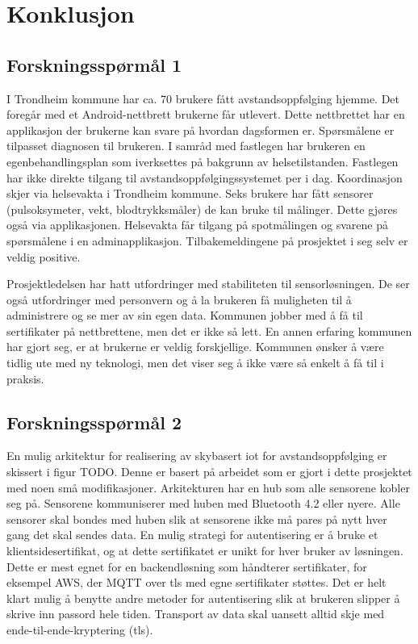 \chapter{Konklusjon}
\label{ch:conclusion}

\section{Forskningsspørmål 1}
\textbf{}

I Trondheim kommune har ca. 70 brukere fått avstandsoppfølging hjemme. Det
foregår med et Android-nettbrett brukerne får utlevert. Dette nettbrettet har en
applikasjon der brukerne kan svare på hvordan dagsformen er. Spørsmålene er
tilpasset diagnosen til brukeren. I samråd med fastlegen har brukeren en
egenbehandlingsplan som iverksettes på bakgrunn av helsetilstanden. Fastlegen
har ikke direkte tilgang til avstandsoppfølgingssystemet per i dag. Koordinasjon skjer via
helsevakta i Trondheim kommune. Seks brukere har fått sensorer (pulsoksymeter, vekt, blodtrykksmåler) de kan bruke
til målinger. Dette gjøres også via applikasjonen. Helsevakta får tilgang på
spotmålingen og svarene på spørsmålene i en adminapplikasjon.
Tilbakemeldingene på prosjektet i seg selv er veldig positive.

Prosjektledelsen har hatt utfordringer med stabiliteten til sensorløsningen.
De ser også utfordringer med personvern og å la brukeren få muligheten til å administrere og se mer av sin egen data.
Kommunen jobber med å få til sertifikater på nettbrettene, men det er ikke så lett. En annen erfaring
kommunen har gjort seg, er at brukerne er veldig forskjellige. Kommunen ønsker å være tidlig ute med
ny teknologi, men det viser seg å ikke være så enkelt å få til i praksis.

\section{Forskningsspørmål 2}
\textbf{}

En mulig arkitektur for realisering av skybasert \gls{iot} for
avstandsoppfølging er skissert i figur TODO. Denne er basert på arbeidet som er
gjort i dette prosjektet med noen små modifikasjoner. Arkitekturen har en hub som
alle sensorene kobler seg på. Sensorene kommuniserer med huben med Bluetooth 4.2
eller nyere. Alle sensorer skal bondes med huben slik at sensorene ikke må pares
på nytt hver gang det skal sendes data. En mulig strategi for autentisering er å
bruke et klientsidesertifikat, og at dette sertifikatet er unikt for hver bruker
av løsningen. Dette er mest egnet for en backendløsning som håndterer
sertifikater, for eksempel AWS, der MQTT over \gls{tls} med egne sertifikater
støttes. Det er helt klart mulig å benytte andre metoder for autentisering slik
at brukeren slipper å skrive inn passord hele tiden. Transport av data skal
uansett alltid skje med ende-til-ende-kryptering (\gls{tls}).

